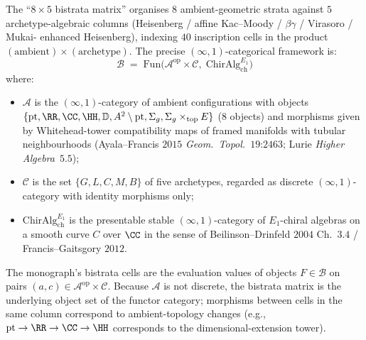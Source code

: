 \begin{theorem}
\label{wn:thm:third-pass-bistrata}

The ``$8 \times 5$ bistrata matrix'' organises
$8$ ambient-geometric strata against $5$ archetype-algebraic columns
(Heisenberg / affine Kac--Moody / $\beta\gamma$ / Virasoro / Mukai-
enhanced Heisenberg), indexing $40$ inscription cells in the product
$(\text{ambient}) \times (\text{archetype})$. The precise
$(\infty, 1)$-categorical framework is:
\[
\mathcal{B} \;=\;
\mathrm{Fun}\bigl(\mathcal{A}^{\mathrm{op}} \times \mathcal{C},\;
\mathrm{ChirAlg}^{E_1}_{\mathrm{ch}}\bigr)
\]
where:
\begin{itemize}
\item $\mathcal{A}$ is the $(\infty, 1)$-category of ambient
configurations with objects
$\{\mathrm{pt},\RR, \CC, \HH, \mathbb{D}, A^2\setminus\mathrm{pt},
\Sigma_g, \Sigma_g \times_{\mathrm{top}} E\}$ ($8$ objects) and
morphisms given by Whitehead-tower compatibility maps of framed
manifolds with tubular neighbourhoods (Ayala--Francis $2015$
\emph{Geom.~Topol.}~$19$:$2463$; Lurie \emph{Higher Algebra}~$5.5$);
\item $\mathcal{C}$ is the set $\{G, L, C, M, B\}$ of five archetypes,
regarded as discrete $(\infty, 1)$-category with identity morphisms
only;
\item $\mathrm{ChirAlg}^{E_1}_{\mathrm{ch}}$ is the presentable
stable $(\infty, 1)$-category of $E_1$-chiral algebras on a smooth
curve $C$ over $\CC$ in the sense of Beilinson--Drinfeld $2004$
Ch.~$3.4$ / Francis--Gaitsgory $2012$.
\end{itemize}

The monograph's bistrata cells are the evaluation values of objects
$F \in \mathcal{B}$ on pairs $(a, c) \in \mathcal{A}^{\mathrm{op}}
\times \mathcal{C}$. Because $\mathcal{A}$ is not discrete, the
bistrata matrix is the underlying object set of the functor
category; morphisms between cells in the same column correspond to
ambient-topology changes (e.g., $\mathrm{pt} \to \RR \to \CC \to \HH$
corresponds to the dimensional-extension tower).


\end{theorem}

